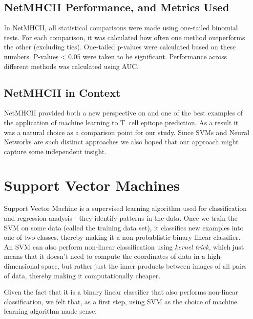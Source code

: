\documentclass[journal]{IEEEtran}
\begin{document}


\subsection{NetMHCII Performance, and Metrics Used}
In NetMHCII, all statistical comparisons were made using one-tailed binomial tests. For each comparison, it was calculated how often one method outperforms the other (excluding ties). One-tailed p-values were calculated based on these numbers. P-values < 0.05 were taken to be significant. Performance across different methods was calculated using AUC.

\subsection{NetMHCII in Context}
NetMHCII provided both a new perspective on and one of the best examples of the application of machine learning to T~cell epitope prediction.  As a result it was a natural choice as a comparison point for our study.  Since SVMs and Neural Networks are such distinct approaches we also hoped that our approach might capture some independent insight.


\section{Support Vector Machines}
Support Vector Machine is a supervised learning algorithm used for classification and regression analysis - they identify patterns in the data. Once we train the SVM on some data (called the training data set), it classifies new examples into one of two classes, thereby making it a non-probablistic binary linear classifier. An SVM can also perform non-linear classification using \textit{kernel trick}, which just means that it doesn't need to compute the coordinates of data in a high-dimensional space, but rather just the inner products between images of all pairs of data, thereby making it computationally cheaper. 

Given the fact that it is a binary linear classifier that also performs non-linear classification, we felt that, as a first step, using SVM as the choice of machine learning algorithm made sense. 
\end{document}
